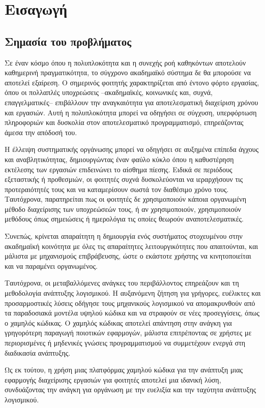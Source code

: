 \chapter{Εισαγωγή}
	\section{Σημασία του προβλήματος}
		Σε έναν κόσμο όπου η πολυπλοκότητα και η συνεχής ροή καθηκόντων αποτελούν καθημερινή πραγματικότητα, το σύγχρονο ακαδημαϊκό σύστημα δε θα μπορούσε να αποτελεί εξαίρεση. Ο σημερινός φοιτητής χαρακτηρίζεται από έντονο φόρτο εργασίας, όπου οι πολλαπλές υποχρεώσεις --ακαδημαϊκές, κοινωνικές και, συχνά, επαγγελματικές-- επιβάλλουν την αναγκαιότητα για αποτελεσματική διαχείριση χρόνου και εργασιών. Αυτή η πολυπλοκότητα μπορεί να οδηγήσει σε σύγχυση, υπερφόρτωση πληροφοριών και δυσκολία στον αποτελεσματικό προγραμματισμό, επηρεάζοντας άμεσα την απόδοσή του.

		Η έλλειψη συστηματικής οργάνωσης μπορεί να οδηγήσει σε αυξημένα επίπεδα άγχους και αναβλητικότητας, δημιουργώντας έναν φαύλο κύκλο όπου η καθυστέρηση εκτέλεσης των εργασιών επιδεινώνει το αίσθημα πίεσης. Ειδικά σε περιόδους εξεταστικής ή προθεσμιών, οι φοιτητές συχνά δυσκολεύονται να ιεραρχήσουν τις προτεραιότητές τους και να καταμερίσουν σωστά τον διαθέσιμο χρόνο τους. Ταυτόχρονα, παρατηρείται πως οι φοιτητές δε χρησιμοποιούν κάποια οργανωμένη μέθοδο διαχείρισης των υποχρεώσεών τους, ή αν χρησιμοποιούν, χρησιμοποιούν μεθόδους όπως σημειώσεις ή ημερολόγια τις οποίες θεωρούν αναποτελεσματικές.

		Συνεπώς, κρίνεται απαραίτητη η δημιουργία ενός συστήματος στοχευμένου στην ακαδημαϊκή κοινότητα με όλες τις απαραίτητες λειτουργικότητες που απαιτούνται, και μάλιστα με μηχανισμούς επιβράβευσης, ώστε ο εκάστοτε χρήστης να κινητοποιείται και να παραμένει οργανωμένος.

		Ταυτόχρονα, οι μεταβαλλόμενες ανάγκες του περιβάλλοντος επηρεάζουν και τη μεθοδολογία ανάπτυξης λογισμικού. Η αυξανόμενη ζήτηση για γρήγορες, ευέλικτες και προσαρμοστικές λύσεις οδήγησε τους μηχανικούς λογισμικού να απομακρυνθούν από τα παραδοσιακά μοντέλα υψηλού κώδικα και να στραφούν σε νέες προσεγγίσεις, όπως ο χαμηλός κώδικας. Ο χαμηλός κώδικας αποτελεί απάντηση στην ανάγκη για γρηγορότερη παραγωγή ποιοτικών εφαρμογών, μάλιστα επιτρέποντας σε χρήστες με περιορισμένες ή μηδενικές γνώσεις προγραμματισμού να συμμετέχουν ενεργά στη διαδικασία ανάπτυξης.

		Ως εκ τούτου, η χρήση μιας πλατφόρμας χαμηλού κώδικα για την ανάπτυξη μιας εφαρμογής διαχείρισης εργασιών για φοιτητές αποτελεί μια ιδανική λύση, συνδυάζοντας την ανάγκη για οργάνωση με την ευελιξία και την ταχύτητα ανάπτυξης λογισμικού.


